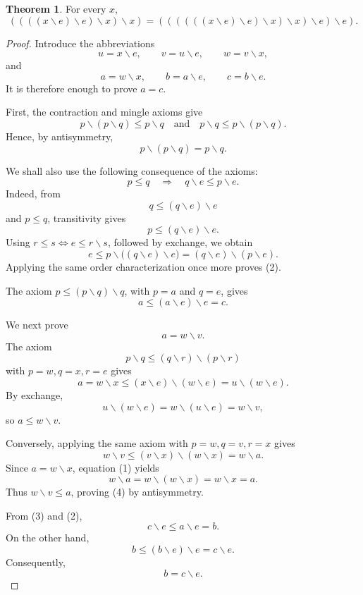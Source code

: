\documentclass{article}
\theoremstyle{definition}
\newtheorem{theorem}{Theorem}
\begin{document}
\newcommand{\res}{\mathbin{\backslash}}

\begin{theorem}
For every \(x\),
\[
((((x\res e)\res e)\res x)\res x)
=
((((((x\res e)\res e)\res x)\res x)\res e)\res e).
\]
\end{theorem}

\begin{proof}
Introduce the abbreviations
\[
u=x\res e,\qquad
v=u\res e,\qquad
w=v\res x,
\]
and
\[
a=w\res x,\qquad
b=a\res e,\qquad
c=b\res e.
\]
It is therefore enough to prove \(a=c\).

First, the contraction and mingle axioms give
\[
p\res(p\res q)\leq p\res q
\quad\text{and}\quad
p\res q\leq p\res(p\res q).
\]
Hence, by antisymmetry,
\begin{equation}
p\res(p\res q)=p\res q.
\tag{1}
\end{equation}

We shall also use the following consequence of the axioms:
\begin{equation}
p\leq q
\quad\Longrightarrow\quad
q\res e\leq p\res e.
\tag{2}
\end{equation}
Indeed, from
\[
q\leq(q\res e)\res e
\]
and \(p\leq q\), transitivity gives
\[
p\leq(q\res e)\res e.
\]
Using \(r\leq s\iff e\leq r\res s\), followed by exchange, we obtain
\[
e\leq p\res\bigl((q\res e)\res e\bigr)
  =(q\res e)\res(p\res e).
\]
Applying the same order characterization once more proves (2).

The axiom \(p\leq(p\res q)\res q\), with \(p=a\) and \(q=e\),
gives
\begin{equation}
a\leq(a\res e)\res e=c.
\tag{3}
\end{equation}

We next prove
\begin{equation}
a=w\res v.
\tag{4}
\end{equation}
The axiom
\[
p\res q\leq(q\res r)\res(p\res r)
\]
with \(p=w,q=x,r=e\) gives
\[
a=w\res x
 \leq(x\res e)\res(w\res e)
 =u\res(w\res e).
\]
By exchange,
\[
u\res(w\res e)=w\res(u\res e)=w\res v,
\]
so \(a\leq w\res v\).

Conversely, applying the same axiom with \(p=w,q=v,r=x\) gives
\[
w\res v
 \leq(v\res x)\res(w\res x)
 =w\res a.
\]
Since \(a=w\res x\), equation (1) yields
\[
w\res a=w\res(w\res x)=w\res x=a.
\]
Thus \(w\res v\leq a\), proving (4) by antisymmetry.

From (3) and (2),
\[
c\res e\leq a\res e=b.
\]
On the other hand,
\[
b\leq(b\res e)\res e=c\res e.
\]
Consequently,
\begin{equation}
b=c\res e.
\tag{5}
\end{equation}


\end{proof}
\end{document}
